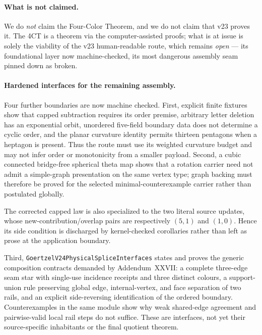 \documentclass[11pt]{article}
\theoremstyle{definition}
\begin{document}
\paragraph{What is not claimed.} We do \emph{not} claim the Four-Color Theorem,
and we do not claim that v23 proves it. The 4CT is a theorem via the
computer-assisted proofs; what is at issue is solely the viability of the v23
human-readable route, which remains \emph{open} --- its foundational layer now
machine-checked, its most dangerous assembly seam pinned down as broken.

\paragraph{Hardened interfaces for the remaining assembly.}
Four further boundaries are now machine checked.  First, explicit finite
fixtures show that capped subtraction requires its order premise, arbitrary
letter deletion has an exponential orbit, unordered five-field boundary data
does not determine a cyclic order, and the planar curvature identity permits
thirteen pentagons when a heptagon is present.  Thus the route must use its
weighted curvature budget and may not infer order or monotonicity from a
smaller payload.  Second, a cubic connected bridge-free spherical theta map
shows that a rotation carrier need not admit a simple-graph presentation on
the same vertex type; graph backing must therefore be proved for the selected
minimal-counterexample carrier rather than postulated globally.

The corrected capped law is also specialized to the two literal source
updates, whose new-contribution/overlap pairs are respectively $(5,1)$ and
$(1,0)$.  Hence its side condition is discharged by kernel-checked
corollaries rather than left as prose at the application boundary.

Third, \texttt{GoertzelV24PhysicalSpliceInterfaces} states and proves the
generic composition contracts demanded by Addendum~XXVII: a complete
three-edge seam star with single-use incidence receipts and three distinct
colours, a support-union rule preserving global edge, internal-vertex, and
face separation of two rails, and an explicit side-reversing identification
of the ordered boundary.  Counterexamples in the same module show why weak
shared-edge agreement and pairwise-valid local rail steps do not suffice.
These are interfaces, not yet their source-specific inhabitants or the final
quotient theorem.
\end{document}
